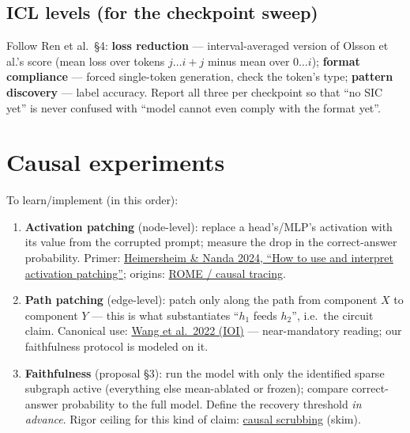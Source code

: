 \documentclass[11pt]{article}
\begin{document}
\subsection{ICL levels (for the checkpoint sweep)}
Follow Ren et al.\ \S4: \textbf{loss reduction} --- interval-averaged version of Olsson et al.'s score (mean loss over tokens $j\ldots i{+}j$ minus mean over $0\ldots i$); \textbf{format compliance} --- forced single-token generation, check the token's type; \textbf{pattern discovery} --- label accuracy. Report all three per checkpoint so that ``no SIC yet'' is never confused with ``model cannot even comply with the format yet''.

\section{Causal experiments}
To learn/implement (in this order):
\begin{enumerate}[itemsep=2pt]
  \item \textbf{Activation patching} (node-level): replace a head's/MLP's activation with its value from the corrupted prompt; measure the drop in the correct-answer probability. Primer: \href{https://arxiv.org/abs/2404.15255}{Heimersheim \& Nanda 2024, ``How to use and interpret activation patching''}; origins: \href{https://arxiv.org/abs/2202.05262}{ROME / causal tracing}.
  \item \textbf{Path patching} (edge-level): patch only along the path from component $X$ to component $Y$ --- this is what substantiates ``$h_1$ feeds $h_2$'', i.e.\ the circuit claim. Canonical use: \href{https://arxiv.org/abs/2211.00593}{Wang et al.\ 2022 (IOI)} --- near-mandatory reading; our faithfulness protocol is modeled on it.
  \item \textbf{Faithfulness} (proposal \S3): run the model with only the identified sparse subgraph active (everything else mean-ablated or frozen); compare correct-answer probability to the full model. Define the recovery threshold \emph{in advance}. Rigor ceiling for this kind of claim: \href{https://www.alignmentforum.org/posts/JvZhhzycHu2Yd57RN/causal-scrubbing-a-method-for-rigorously-testing}{causal scrubbing} (skim).
\end{enumerate}
\end{document}

